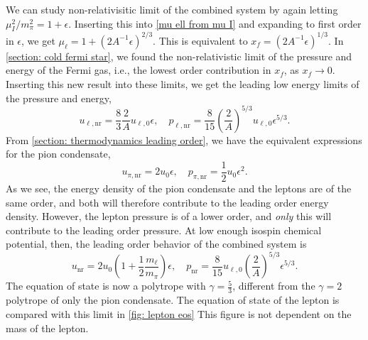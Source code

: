 \documentclass{book}
\begin{document}
We can study non-relativisitic limit of the combined system by again letting $\mu_I^2/m_\pi^2 = 1 + \epsilon$.
Inserting this into \autoref{mu ell from mu I} and expanding to first order in $\epsilon$, we get $\mu_\ell = 1 + (2 A^{-1} \epsilon)^{2/3} $.
This is equivalent to $x_f = (2 A^{-1} \epsilon)^{1/3} $.
In \autoref{section: cold fermi star}, we found the non-relativistic limit of the pressure and energy of the Fermi gas, i.e., the lowest order contribution in $x_f$, as $x_f \rightarrow 0$.
Inserting this new result into these limits, we get the leading low energy limits of the pressure and energy, 
%
\begin{equation}
    u_{\ell, \text{nr}} = \frac{8}{3} \frac{2}{A} u_{\ell,0} \epsilon, \quad
    p_{\ell, \text{nr}} = \frac{8}{15} \left(\frac{2}{A} \right)^{5/3}  u_{\ell,0}  \epsilon^{5/3}.
\end{equation}
%
From \autoref{section: thermodynamics leading order}, we have the equivalent expressions for the pion condensate,
%
\begin{equation}
    u_{\pi, \text{nr}} = 2 u_0 \epsilon, \quad p_{\pi, \text{nr}} = \frac{1}{2} u_0 \epsilon^2.
\end{equation}
%
As we see, the energy density of the pion condensate and the leptons are of the same order, and both will therefore contribute to the leading order energy density.
However, the lepton pressure is of a lower order, and \emph{only} this will contribute to the leading order pressure.
At low enough isospin chemical potential, then, the leading order behavior of the combined system is
%
\begin{equation}
    u_{\text{nr}} 
    = 2 u_0 \left(1 + \frac{1}{2}\frac{m_\ell}{m_\pi} \right)  \epsilon, \quad
    p_{\text{nr}} = \frac{8}{15} u_{\ell,0} \left(\frac{2}{A} \right)^{5/3} \epsilon^{5/3}.
\end{equation}
%
The equation of state is now a polytrope with $\gamma = \frac{5}{3}$, different from the $\gamma = 2$ polytrope of only the pion condensate.
The equation of state of the lepton is compared with this limit in \autoref{fig: lepton eos}
This figure is not dependent on the mass of the lepton.

\end{document}
